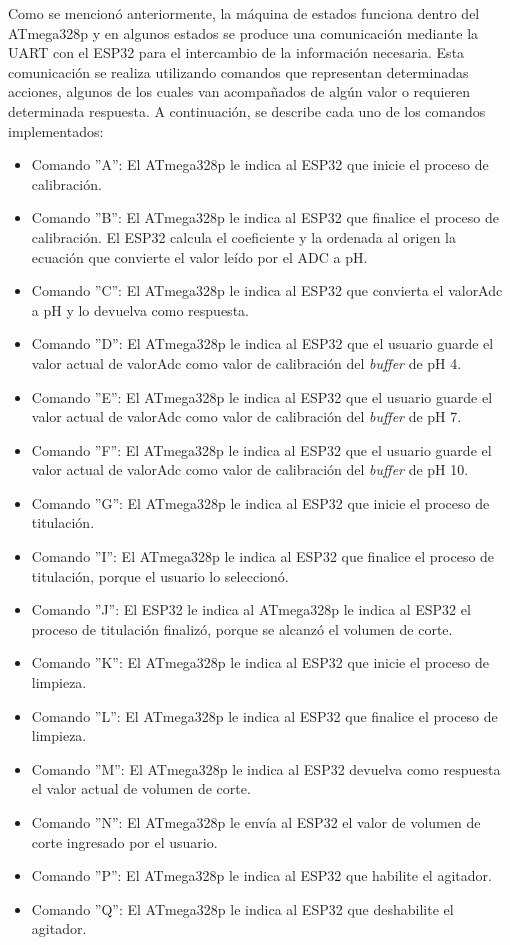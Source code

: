 Como se mencionó anteriormente, la máquina de estados funciona dentro del ATmega328p y en algunos estados se produce una comunicación mediante la UART con el ESP32 para el intercambio de la información necesaria. Esta comunicación se realiza utilizando comandos que representan determinadas acciones, algunos de los cuales van acompañados de algún valor o requieren determinada respuesta. A continuación, se describe cada uno de los comandos implementados:

\begin{itemize}
	\item Comando ''A'': El ATmega328p le indica al ESP32 que inicie el proceso de calibración.
	\item Comando ''B'': El ATmega328p le indica al ESP32 que finalice el proceso de calibración. El ESP32 calcula el coeficiente y la ordenada al origen la ecuación que convierte el valor leído por el ADC a pH.
	\item Comando ''C'': El ATmega328p le indica al ESP32 que convierta el valorAdc a pH y lo devuelva como respuesta.
	\item Comando ''D'': El ATmega328p le indica al ESP32 que el usuario guarde el valor actual de valorAdc como valor de calibración del \textit{buffer} de pH 4.
	\item Comando ''E'': El ATmega328p le indica al ESP32 que el usuario guarde el valor actual de valorAdc como valor de calibración del \textit{buffer} de pH 7.
	\item Comando ''F'': El ATmega328p le indica al ESP32 que el usuario guarde el valor actual de valorAdc como valor de calibración del \textit{buffer} de pH 10.
	\item Comando ''G'': El ATmega328p le indica al ESP32 que inicie el proceso de titulación.
	\item Comando ''I'': El ATmega328p le indica al ESP32 que finalice el proceso de titulación, porque el usuario lo seleccionó.  
	\item Comando ''J'': El ESP32 le indica al ATmega328p le indica al ESP32 el proceso de titulación finalizó, porque se alcanzó el volumen de corte.
	\item Comando ''K'': El ATmega328p le indica al ESP32 que inicie el proceso de limpieza.
	\item Comando ''L'': El ATmega328p le indica al ESP32 que finalice el proceso de limpieza.
	\item Comando ''M'': El ATmega328p le indica al ESP32 devuelva como respuesta el valor actual de volumen de corte.
	\item Comando ''N'': El ATmega328p le envía al ESP32 el valor de volumen de corte ingresado por el usuario.
	\item Comando ''P'': El ATmega328p le indica al ESP32 que habilite el agitador.
	\item Comando ''Q'': El ATmega328p le indica al ESP32 que deshabilite el agitador.
\end{itemize}



